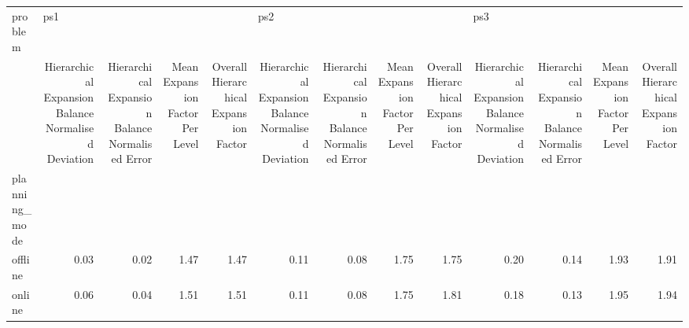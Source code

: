 \begin{tabular}{lrrrrrrrrrrrr}
\toprule
problem & \multicolumn{4}{l}{ps1} & \multicolumn{4}{l}{ps2} & \multicolumn{4}{l}{ps3} \\
{} & Hierarchical Expansion Balance Normalised Deviation & Hierarchical Expansion Balance Normalised Error & Mean Expansion Factor Per Level & Overall Hierarchical Expansion Factor & Hierarchical Expansion Balance Normalised Deviation & Hierarchical Expansion Balance Normalised Error & Mean Expansion Factor Per Level & Overall Hierarchical Expansion Factor & Hierarchical Expansion Balance Normalised Deviation & Hierarchical Expansion Balance Normalised Error & Mean Expansion Factor Per Level & Overall Hierarchical Expansion Factor \\
planning\_mode &                                                     &                                                 &                                 &                                       &                                                     &                                                 &                                 &                                       &                                                     &                                                 &                                 &                                       \\
\midrule
offline       &                                               0.03 &                                            0.02 &                            1.47 &                                  1.47 &                                               0.11 &                                            0.08 &                            1.75 &                                  1.75 &                                               0.20 &                                            0.14 &                            1.93 &                                  1.91 \\
online        &                                               0.06 &                                            0.04 &                            1.51 &                                  1.51 &                                               0.11 &                                            0.08 &                            1.75 &                                  1.81 &                                               0.18 &                                            0.13 &                            1.95 &                                  1.94 \\
\bottomrule
\end{tabular}
